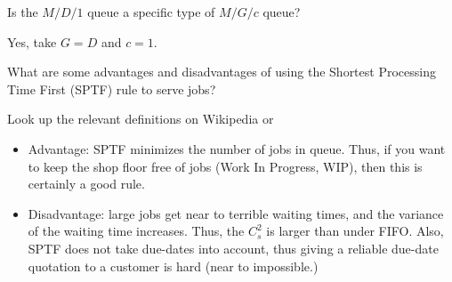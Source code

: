 \begin{exercise}
  Is the $M/D/1$ queue a specific type of  $M/G/c$ queue? 
  \begin{solution}
    Yes, take $G=D$ and $c=1$. 
  \end{solution}
\end{exercise}

\begin{exercise}
  What are some advantages and disadvantages of using the Shortest
  Processing Time First (SPTF) rule to serve jobs? 
  \begin{hint}
Look up the relevant
  definitions on Wikipedia or
  \citet{hall91:_queuein_method_servic_manuf}
  \end{hint}
  \begin{solution}
  \begin{itemize}
  \item Advantage: SPTF minimizes the number of jobs in queue. Thus,
    if you want to keep the shop floor free of jobs (Work In Progress,
    WIP), then this is certainly a good rule. 
  \item Disadvantage: large jobs get near to terrible waiting times,
    and the variance of the waiting time increases. Thus, the $C_s^2$
    is larger than under FIFO. Also, SPTF does not take due-dates into
    account, thus giving a reliable due-date quotation to a customer is
    hard (near to impossible.)
  \end{itemize}
  \end{solution}
\end{exercise}





